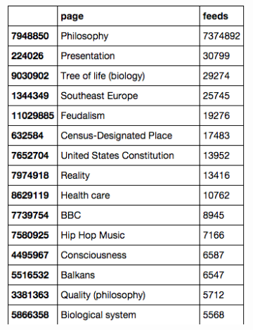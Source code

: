 \documentclass[twoside]{article}
\begin{document}
\begin{figure}[H]
\centering
    \caption{Top Funnels}
    \begin{subfigure}[b]{0.5\textwidth}
        \includegraphics[width=\textwidth]{graphics/top_funnels.png}
    \end{subfigure}
\end{figure}
\end{document}

